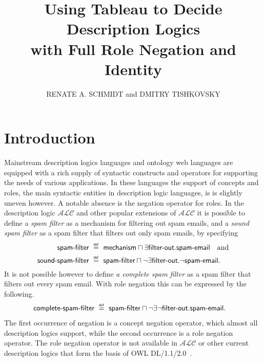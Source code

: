 \documentclass[leqno
,pdflatex
,prodmode
,acmtocl
]{acmsmall}
\title{Using Tableau to Decide Description Logics\\ with Full Role Negation and Identity}
\author{RENATE A. SCHMIDT and DMITRY TISHKOVSKY 
\affil{The University of Manchester, UK}}
\makeatletter
\newcommand{\mathcmd}[1]{\ensuremath{#1}\xspace}
\newcommand{\dlfont}{\mathcal}
\newcommand{\dl}[1]{\mathcmd{\dlfont{#1}}}
\newcommand{\ALC}{\dl{ALC}}
\def\And{\sqcap}
\def\Not{\neg}
\newcommand{\metasmbfont}{\mathsf}
\def\@define#1{\mathcmd{\stackrel {\mbox{\tiny\ensuremath{\metasmbfont{def}}}}{{#1}}}}
\def\sm@shdefine#1{\smash[t]{\@define{#1}}}
\newcommand{\define}{\mathchoice{\@define{\ =\ }}{\sm@shdefine{=}}{\sm@shdefine{=}}{\sm@shdefine{=}}}
\makeatother
\begin{document}
\maketitle

\section{Introduction}

Mainstream description logics languages and ontology web languages
are equipped with a rich supply of syntactic constructs and operators
for supporting the needs of various applications.
In these languages the support of concepts and roles, the main
syntactic entities in description logic languages, is 
is slightly uneven however. A notable absence is the negation operator for roles.
In the description logic \ALC and other popular extensions
of \ALC it is possible to define
a \emph{spam filter} as a mechanism for filtering
out spam emails, and
a \emph{sound spam filter} as a spam filter that
filters out only spam emails,
by specifying
\begin{align*}
\textsf{spam-filter} & \define \textsf{mechanism}
\And \exists\textsf{filter-out}.\textsf{spam-email} \quad \text{and}
\\
\textsf{sound-spam-filter} & \define \textsf{spam-filter} \And
\Not\exists\textsf{filter-out}.\Not\textsf{spam-email}.
\end{align*}
It is not possible however to define \emph{a complete spam filter}
as a spam filter that filters out every spam email.
With role negation this can be expressed by the following. 
\begin{align*}
\textsf{complete-spam-filter} 
& \define \textsf{spam-filter} \And
\Not\exists\Not\textsf{filter-out}.\textsf{spam-email}.
\end{align*} 
The first occurrence of negation is a concept negation operator, which
almost all description logics support, while the second occurrence is a
role negation operator.
The role negation operator is
not available in \ALC or other current description logics that form
the basis of OWL
DL/1.1/2.0~\cite{BaaderCalvaneseEtal03,owl,owl2}.
\end{document}
